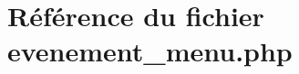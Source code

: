 \hypertarget{evenement__menu_8php}{
\section{R\'{e}f\'{e}rence du fichier evenement\_\-menu.php}
\label{evenement__menu_8php}
}
